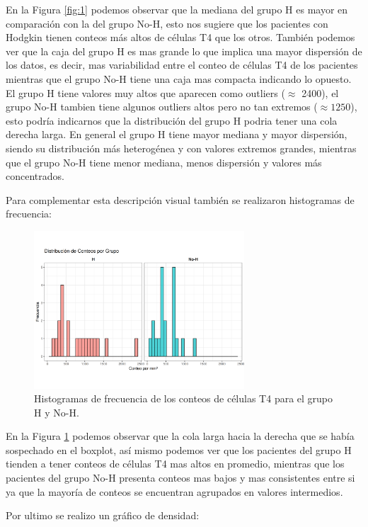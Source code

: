 En la Figura \ref{fig:1} podemos observar que la mediana del grupo H es mayor en comparación con la del grupo No-H, esto nos sugiere que los pacientes con Hodgkin tienen conteos más altos de células T4 que los otros. También podemos ver que la caja del grupo H es mas grande lo que implica una mayor dispersión de los datos, es decir, mas variabilidad entre el conteo de células T4 de los pacientes mientras que el grupo No-H tiene una caja mas compacta indicando lo opuesto. El grupo H tiene valores muy altos que aparecen como outliers ($\approx$ 2400), el grupo No-H tambien tiene algunos outliers altos pero no tan extremos ($\approx1250$), esto podría indicarnos que la distribución del grupo H podria tener una cola derecha larga. En general el grupo H tiene mayor mediana y mayor dispersión, siendo su distribución más heterogénea y con valores extremos grandes, mientras que el grupo No-H tiene menor mediana, menos dispersión y valores más concentrados.

Para complementar esta descripción visual también se realizaron histogramas de frecuencia:
\begin{figure}[H]
    \centering
    \includegraphics[width=0.7\textwidth]{images/histogramas_comparativos.png}
    \caption{Histogramas de frecuencia de los conteos de células T4 para el grupo H y No-H.}
    \label{fig:2}
\end{figure}

En la Figura \ref{fig:2} podemos observar que la cola larga hacia la derecha que se había sospechado en el boxplot, así mismo podemos ver que los pacientes del grupo H tienden a tener conteos de células T4 mas altos en promedio, mientras que los pacientes del grupo No-H presenta conteos mas bajos y mas consistentes entre si ya que la mayoría de conteos se encuentran agrupados en valores intermedios.

Por ultimo se realizo un gráfico de densidad: 

